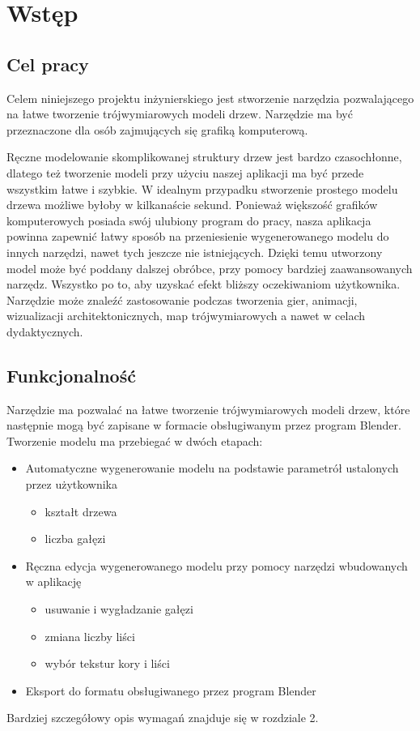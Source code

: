 \chapter{Wstęp}

\section{Cel pracy}
Celem niniejszego projektu inżynierskiego jest stworzenie narzędzia pozwalającego na łatwe 
tworzenie trójwymiarowych modeli drzew. Narzędzie ma być przeznaczone dla osób zajmujących
się grafiką komputerową.

Ręczne modelowanie skomplikowanej struktury drzew jest bardzo czasochłonne,
dlatego też tworzenie modeli przy użyciu naszej aplikacji ma być przede wszystkim łatwe i szybkie.
W idealnym przypadku stworzenie prostego modelu drzewa możliwe byłoby w kilkanaście sekund. Ponieważ większość
grafików komputerowych posiada swój ulubiony program do pracy, nasza aplikacja powinna zapewnić
łatwy sposób na przeniesienie wygenerowanego modelu do innych narzędzi, nawet tych jeszcze nie istniejących.
Dzięki temu utworzony model może być poddany dalszej obróbce, przy pomocy bardziej zaawansowanych narzędz. Wszystko po to, aby uzyskać
efekt bliższy oczekiwaniom użytkownika.
\\ \indent Narzędzie może znaleźć zastosowanie podczas tworzenia gier, animacji, wizualizacji architektonicznych, map trójwymiarowych a nawet w celach dydaktycznych.


\newpage
\section{Funkcjonalność}
Narzędzie ma pozwalać na łatwe tworzenie trójwymiarowych modeli drzew, które następnie mogą być zapisane
w formacie obsługiwanym przez program Blender. Tworzenie modelu ma przebiegać w dwóch etapach:
\begin{itemize}
	\item{Automatyczne wygenerowanie modelu na podstawie parametrół ustalonych przez użytkownika}
	\begin{itemize}
		\item{kształt drzewa}
		\item{liczba gałęzi}
	\end{itemize}
	\item{Ręczna edycja wygenerowanego modelu przy pomocy narzędzi wbudowanych w aplikację}
	\begin{itemize}
		\item{usuwanie  i wygładzanie gałęzi}
		\item{zmiana liczby liści}
		\item{wybór tekstur kory i liści}
	\end{itemize}

	\item{Eksport do formatu obsługiwanego przez program Blender}
\end{itemize}
Bardziej szczegółowy opis wymagań znajduje się w rozdziale 2.

